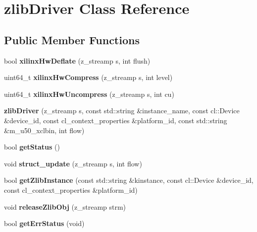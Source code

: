 \hypertarget{classzlibDriver}{\section{zlib\-Driver Class Reference}
\label{classzlibDriver}
}
\subsection*{Public Member Functions}
\begin{DoxyCompactItemize}
\item 
\hypertarget{classzlibDriver_aac5df3ec5fa4a4b9176b5cd1c7fa8b21}{bool {\bfseries xilinx\-Hw\-Deflate} (z\-\_\-streamp s, int flush)}\label{classzlibDriver_aac5df3ec5fa4a4b9176b5cd1c7fa8b21}

\item 
\hypertarget{classzlibDriver_ad258546d6000ab464f4fd006e4d31492}{uint64\-\_\-t {\bfseries xilinx\-Hw\-Compress} (z\-\_\-streamp s, int level)}\label{classzlibDriver_ad258546d6000ab464f4fd006e4d31492}

\item 
\hypertarget{classzlibDriver_a23c281eeb6d90000f2ffc3ff2d91053c}{uint64\-\_\-t {\bfseries xilinx\-Hw\-Uncompress} (z\-\_\-streamp s, int cu)}\label{classzlibDriver_a23c281eeb6d90000f2ffc3ff2d91053c}

\item 
\hypertarget{classzlibDriver_a56d32faa858eb10a47fbf0dce27467ed}{{\bfseries zlib\-Driver} (z\-\_\-streamp s, const std\-::string \&instance\-\_\-name, const cl\-::\-Device \&device\-\_\-id, const cl\-\_\-context\-\_\-properties \&platform\-\_\-id, const std\-::string \&m\-\_\-u50\-\_\-xclbin, int flow)}\label{classzlibDriver_a56d32faa858eb10a47fbf0dce27467ed}

\item 
\hypertarget{classzlibDriver_a5f64f2eee66d23270b084470e7d972d9}{bool {\bfseries get\-Status} ()}\label{classzlibDriver_a5f64f2eee66d23270b084470e7d972d9}

\item 
\hypertarget{classzlibDriver_ae94889732c3e2e128f3fa7ab1578a995}{void {\bfseries struct\-\_\-update} (z\-\_\-streamp s, int flow)}\label{classzlibDriver_ae94889732c3e2e128f3fa7ab1578a995}

\item 
\hypertarget{classzlibDriver_aeb79205ed7c535619f8d8efe66e3b624}{bool {\bfseries get\-Zlib\-Instance} (const std\-::string \&kinstance, const cl\-::\-Device \&device\-\_\-id, const cl\-\_\-context\-\_\-properties \&platform\-\_\-id)}\label{classzlibDriver_aeb79205ed7c535619f8d8efe66e3b624}

\item 
\hypertarget{classzlibDriver_a1830cd5bee7db028ab47ec1fe5ccadbd}{void {\bfseries release\-Zlib\-Obj} (z\-\_\-streamp strm)}\label{classzlibDriver_a1830cd5bee7db028ab47ec1fe5ccadbd}

\item 
\hypertarget{classzlibDriver_ab291d3ab12bd571c59d2e46171230933}{bool {\bfseries get\-Err\-Status} (void)}\label{classzlibDriver_ab291d3ab12bd571c59d2e46171230933}

\end{DoxyCompactItemize}



